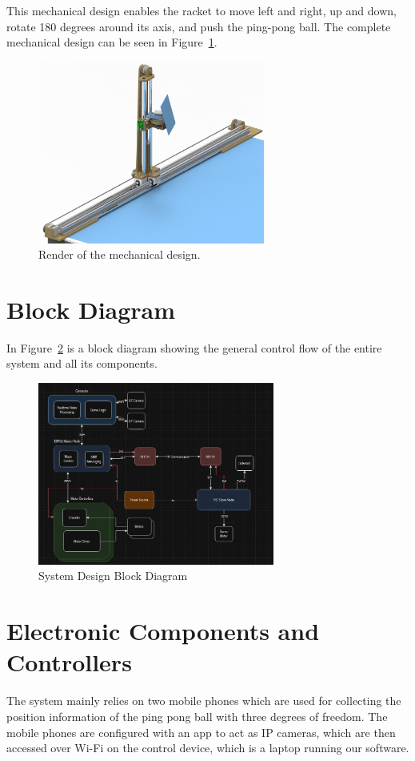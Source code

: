 This mechanical design enables the racket to move left and right, up and down, rotate 180 degrees around its axis, and push the ping-pong ball. The complete mechanical design can be seen in Figure~\ref{fig:mechanical-design}.

\begin{figure}[h] 
	\centering \includegraphics[height=6cm]{./images/render.jpg}
	\caption{Render of the mechanical design.}
	\label{fig:mechanical-design}
\end{figure}

\section{Block Diagram}
In Figure~\ref{fig:block-diagram} is a block diagram showing the general control flow of the entire system and all its components.

\begin{figure}[h]
	\centering\includegraphics[height=6cm]{./images/blockdiagram}
	\caption{System Design Block Diagram}
	\label{fig:block-diagram}
\end{figure}

\section{Electronic Components and Controllers}
The system mainly relies on two mobile phones which are used for collecting the position information of the ping pong ball with three degrees of freedom. The mobile phones are configured with an app to act as IP cameras, which are then accessed over Wi-Fi on the control device, which is a laptop running our software.

